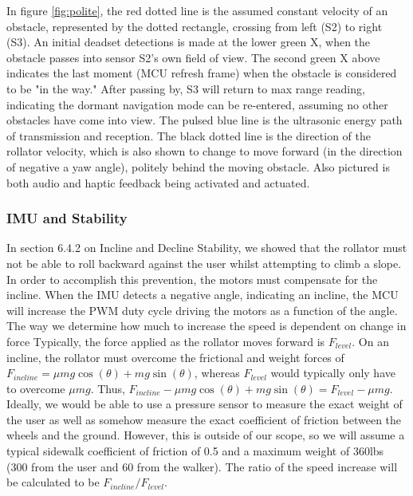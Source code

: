 \noindent In figure \ref{fig:polite}, the red dotted line is the assumed constant velocity of an obstacle, represented by the dotted rectangle, crossing from left (S2) to right (S3). An initial deadset detections is made at the lower green X, when the obstacle passes into sensor S2's own field of view. The second green X above indicates the last moment (MCU refresh frame) when the obstacle is considered to be "in the way." After passing by, S3 will return to max range reading, indicating the dormant navigation mode can be re-entered, assuming no other obstacles have come into view. The pulsed blue line is the ultrasonic energy path of transmission and reception. The black dotted line is the direction of the rollator velocity, which is also shown to change to move forward (in the direction of negative a yaw angle), politely behind the moving obstacle. Also pictured is both audio and haptic feedback being activated and actuated.\\

\subsubsection{IMU and Stability}
\noindent In section 6.4.2 on Incline and Decline Stability, we showed that the rollator must not be able to roll backward against the user whilst attempting to climb a slope. In order to accomplish this prevention, the motors must compensate for the incline. When the IMU detects a negative angle, indicating an incline, the MCU will increase the PWM duty cycle driving the motors as a function of the angle. The way we determine how much to increase the speed is dependent on change in force Typically, the force applied as the rollator moves forward is $F_{level}$. On an incline, the rollator must overcome the frictional and weight forces of  $F_{incline} = \mu m g \cos(\theta) + m g \sin(\theta)$, whereas $F_{level}$ would typically only have to overcome $\mu m g$. Thus, $F_{incline} - \mu m g \cos(\theta) + m g \sin(\theta)  = F_{level} - \mu m g$. Ideally, we would be able to use a pressure sensor to measure the exact weight of the user as well as somehow measure the exact coefficient of friction between the wheels and the ground. However, this is outside of our scope, so we will assume a typical sidewalk coefficient of friction of 0.5\cite{osha2003} and a maximum weight of 360lbs (300 from the user and 60 from the walker). The ratio of the speed increase will be calculated to be $F_{incline}/F_{level}$.\\

